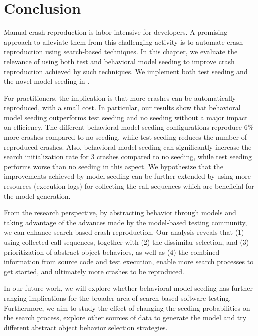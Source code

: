 

\section{Conclusion}
\label{sec:model_seeding:conclusion}

Manual crash reproduction is labor-intensive for developers.
A promising approach to alleviate them from this challenging activity is to automate crash reproduction using search-based techniques. In this chapter, we evaluate the relevance of using both test and behavioral model seeding to improve crash reproduction achieved by such techniques. We implement both test seeding and the novel model seeding in \botsing.

For practitioners, the implication is that more crashes can be automatically reproduced, with a small cost. In particular, our results show that behavioral model seeding outperforms test seeding and no seeding without a major impact on efficiency. The different behavioral model seeding configurations reproduce 6\% more crashes compared to no seeding, while test seeding reduces the number of reproduced crashes. Also, behavioral model seeding can significantly increase the search initialization rate for 3 crashes compared to no seeding, while test seeding performs worse than no seeding in this aspect. We hypothesize that the improvements achieved by model seeding can be further extended by using more resources (\ie execution logs) for collecting the call sequences which are beneficial for the model generation.

From the research perspective, by abstracting behavior through models and taking advantage of the advances made by the model-based testing community, we can enhance search-based crash reproduction.
Our analysis reveals that (1) using collected call sequences, together with (2) the dissimilar selection, and (3) prioritization of abstract object behaviors, as well as (4) the combined information from source code and test execution, enable more search processes to get started, and ultimately more crashes to be reproduced.

In our future work, we will explore whether behavioral model seeding has further ranging implications for the broader area of search-based software testing. Furthermore, we aim to study the effect of changing the seeding probabilities on the search process, explore other sources of data to generate the model and try different abstract object behavior selection strategies.


